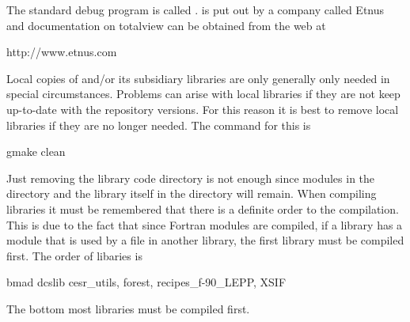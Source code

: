 The standard debug program is called .  is
put out by a company called Etnus and documentation on totalview can
be obtained from the web at
\begin{example}
  http://www.etnus.com
\end{example}

Local copies of \bmad and/or its subsidiary libraries are only
generally only needed in special circumstances. Problems can arise
with local libraries if they are not keep up-to-date with the
repository versions. For this reason it is best to remove local
libraries if they are no longer needed. The command for this is
\begin{example}
  gmake clean
\end{example}
Just removing the library code directory is not enough since modules
in the  directory and the library itself in the 
directory will remain. When compiling libraries it must be remembered
that there is a definite order to the compilation. This is due to the
fact that since Fortran modules are compiled, if a library has a
module that is used by a file in another library, the first library
must be compiled first. The order of libaries is
\begin{example}
  bmad
  dcslib
  cesr_utils, forest, recipes_f-90_LEPP, XSIF 
\end{example}
The bottom most libraries must be compiled first.
